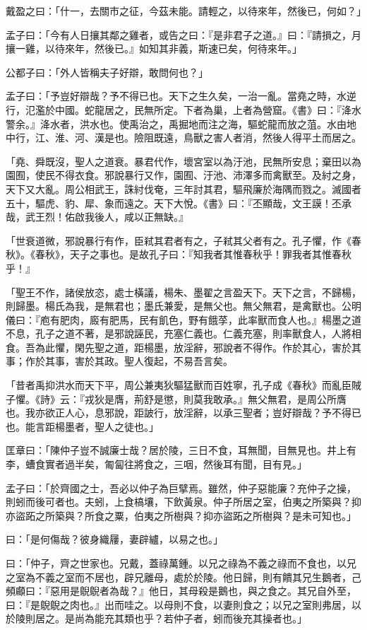 \begin{pinyinscope}
戴盈之曰：「什一，去關市之征，今茲未能。請輕之，以待來年，然後已，何如？」

孟子曰：「今有人日攘其鄰之雞者，或告之曰：『是非君子之道。』曰：『請損之，月攘一雞，以待來年，然後已。』如知其非義，斯速已矣，何待來年。」

公都子曰：「外人皆稱夫子好辯，敢問何也？」

孟子曰：「予豈好辯哉？予不得已也。天下之生久矣，一治一亂。當堯之時，水逆行，氾濫於中國。蛇龍居之，民無所定。下者為巢，上者為營窟。《書》曰：『洚水警余。』洚水者，洪水也。使禹治之，禹掘地而注之海，驅蛇龍而放之菹。水由地中行，江、淮、河、漢是也。險阻既遠，鳥獸之害人者消，然後人得平土而居之。

「堯、舜既沒，聖人之道衰。暴君代作，壞宮室以為汙池，民無所安息；棄田以為園囿，使民不得衣食。邪說暴行又作，園囿、汙池、沛澤多而禽獸至。及紂之身，天下又大亂。周公相武王，誅紂伐奄，三年討其君，驅飛廉於海隅而戮之。滅國者五十，驅虎、豹、犀、象而遠之。天下大悅。《書》曰：『丕顯哉，文王謨！丕承哉，武王烈！佑啟我後人，咸以正無缺。』

「世衰道微，邪說暴行有作，臣弒其君者有之，子弒其父者有之。孔子懼，作《春秋》。《春秋》，天子之事也。是故孔子曰：『知我者其惟春秋乎！罪我者其惟春秋乎！』

「聖王不作，諸侯放恣，處士橫議，楊朱、墨翟之言盈天下。天下之言，不歸楊，則歸墨。楊氏為我，是無君也；墨氏兼愛，是無父也。無父無君，是禽獸也。公明儀曰：『庖有肥肉，廄有肥馬，民有飢色，野有餓莩，此率獸而食人也。』楊墨之道不息，孔子之道不著，是邪說誣民，充塞仁義也。仁義充塞，則率獸食人，人將相食。吾為此懼，閑先聖之道，距楊墨，放淫辭，邪說者不得作。作於其心，害於其事；作於其事，害於其政。聖人復起，不易吾言矣。

「昔者禹抑洪水而天下平，周公兼夷狄驅猛獸而百姓寧，孔子成《春秋》而亂臣賊子懼。《詩》云：『戎狄是膺，荊舒是懲，則莫我敢承。』無父無君，是周公所膺也。我亦欲正人心，息邪說，距詖行，放淫辭，以承三聖者；豈好辯哉？予不得已也。能言距楊墨者，聖人之徒也。」

匡章曰：「陳仲子豈不誠廉士哉？居於陵，三日不食，耳無聞，目無見也。井上有李，螬食實者過半矣，匍匐往將食之，三咽，然後耳有聞，目有見。」

孟子曰：「於齊國之士，吾必以仲子為巨擘焉。雖然，仲子惡能廉？充仲子之操，則蚓而後可者也。夫蚓，上食槁壤，下飲黃泉。仲子所居之室，伯夷之所築與？抑亦盜跖之所築與？所食之粟，伯夷之所樹與？抑亦盜跖之所樹與？是未可知也。」

曰：「是何傷哉？彼身織屨，妻辟纑，以易之也。」

曰：「仲子，齊之世家也。兄戴，蓋祿萬鍾。以兄之祿為不義之祿而不食也，以兄之室為不義之室而不居也，辟兄離母，處於於陵。他日歸，則有饋其兄生鵝者，己頻顣曰：『惡用是鶃鶃者為哉？』他日，其母殺是鵝也，與之食之。其兄自外至，曰：『是鶃鶃之肉也。』出而哇之。以母則不食，以妻則食之；以兄之室則弗居，以於陵則居之。是尚為能充其類也乎？若仲子者，蚓而後充其操者也。」


\end{pinyinscope}